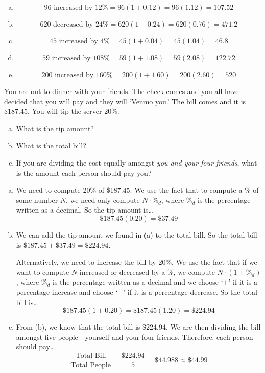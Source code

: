 \documentclass[11pt,letterpaper]{article}
\begin{document}
\begin{enumerate}[(a)]
\item 
	\[
	\text{96 increased by 12\%}= 96(1 + 0.12)= 96(1.12)= 107.52
	\] \pspace

\item 
	\[
	\text{620 decreased by 24\%}= 620(1 - 0.24)= 620(0.76)= 471.2
	\] \pspace

\item 
	\[
	\text{45 increased by 4\%}= 45(1 + 0.04)= 45(1.04)= 46.8
	\] \pspace

\item 
	\[
	\text{59 increased by 108\%}= 59(1 + 1.08)= 59(2.08)= 122.72
	\] \pspace

\item 
	\[
	\text{200 increased by 160\%}= 200(1 + 1.60)= 200(2.60)= 520
	\] 
\end{enumerate}



\newpage



 You are out to dinner with your friends. The check comes and you all have decided that you will pay and they will `Venmo you.' The bill comes and it is \$187.45. You will tip the server 20\%. 
	\begin{enumerate}[(a)]
	\item What is the tip amount?
	\item What is the total bill?
	\item If you are dividing the cost equally amongst \textit{you and your four friends}, what is the amount each person should pay you?
	\end{enumerate} \pspace

\sol 
\begin{enumerate}[(a)]
\item We need to compute 20\% of \$187.45. We use the fact that to compute a \% of some number $N$, we need only compute $N \cdot \%_d$, where $\%_d$ is the percentage written as a decimal. So the tip amount is\dots
	\[
	\$187.45(0.20)= \$37.49
	\] \pspace

\item We can add the tip amount we found in (a) to the total bill. So the total bill is $\$187.45 + \$37.49= \$224.94$. \pspace

Alternatively, we need to increase the bill by 20\%. We use the fact that if we want to compute $N$ increased or decreased by a \%, we compute $N \cdot (1 \pm \%_d)$, where $\%_d$ is the percentage written as a decimal and we choose `$+$' if it is a percentage increase and choose `$-$' if it is a percentage decrease. So the total bill is\dots
	\[
	\$187.45(1 + 0.20)= \$187.45(1.20)= \$224.94
	\] \pspace

\item From (b), we know that the total bill is \$224.94. We are then dividing the bill amongst five people---yourself and your four friends. Therefore, each person should pay\dots
	\[
	\dfrac{\text{Total Bill}}{\text{Total People}}= \dfrac{\$224.94}{5}= \$44.988 \approx \$44.99
	\]
\end{enumerate}
\end{document}
